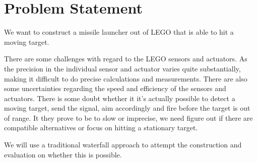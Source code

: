 \section{Problem Statement} 
We want to construct a missile launcher out of LEGO that is able to hit a moving target.

There are some challenges with regard to the LEGO sensors and actuators. As the precision in the individual sensor and actuator varies quite substantially, making it difficult to do precise calculations and measurements. There are also some uncertainties regarding the speed and efficiency of the sensors and actuators. There is some doubt whether it it's actually possible to detect a moving target, send the signal, aim accordingly and fire before the target is out of range. It they prove to be to slow or imprecise, we need figure out if there are compatible alternatives or focus on hitting a stationary target.

We will use a traditional waterfall approach to attempt the construction and evaluation on whether this is possible.